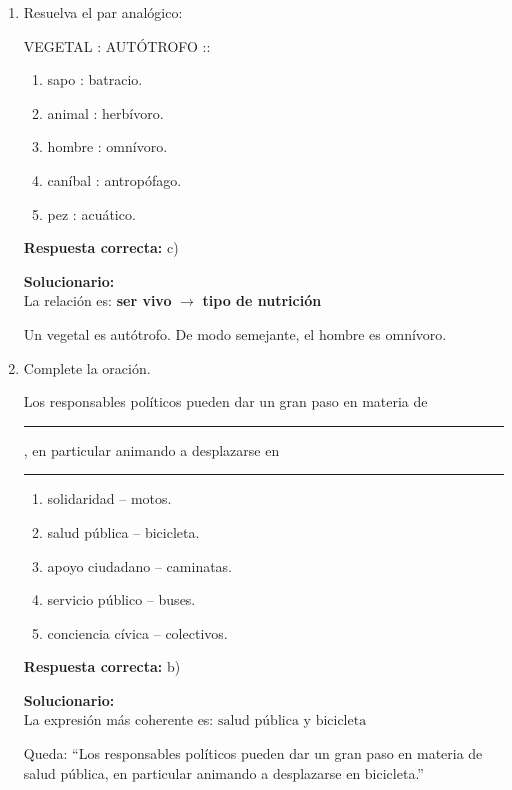 \begin{enumerate}
	\vspace{2mm}
	\textbf{Solucionario:}\\
	\textbf{Camelar} significa enamorar, halagar o seducir.  
	Su antónimo es \textbf{execrar}, que significa aborrecer o condenar.
	
	\vspace{6mm}
	
	\item Resuelva el par analógico:
	
	VEGETAL : AUTÓTROFO ::
	\begin{enumerate}[label=\alph*)]
		\item sapo : batracio.
		\item animal : herbívoro.
		\item hombre : omnívoro.
		\item caníbal : antropófago.
		\item pez : acuático.
	\end{enumerate}
	\textbf{Respuesta correcta:} c)
	
	\vspace{2mm}
	\textbf{Solucionario:}\\
	La relación es:
	\textbf{ser vivo} $\rightarrow$ \textbf{tipo de nutrición}
	
	Un vegetal es autótrofo.  
	De modo semejante, el hombre es omnívoro.
	
	\vspace{6mm}
	
	\item Complete la oración.
	
	Los responsables políticos pueden dar un gran paso en materia de \rule{2cm}{0.4pt}, en particular animando a desplazarse en \rule{2cm}{0.4pt}
	\begin{enumerate}[label=\alph*)]
		\item solidaridad -- motos.
		\item salud pública -- bicicleta.
		\item apoyo ciudadano -- caminatas.
		\item servicio público -- buses.
		\item conciencia cívica -- colectivos.
	\end{enumerate}
	\textbf{Respuesta correcta:} b)
	
	\vspace{2mm}
	\textbf{Solucionario:}\\
	La expresión más coherente es:
	$ \text{salud pública} $ y $ \text{bicicleta} $
	
	Queda:
	``Los responsables políticos pueden dar un gran paso en materia de salud pública, en particular animando a desplazarse en bicicleta.''
	

\end{enumerate}
